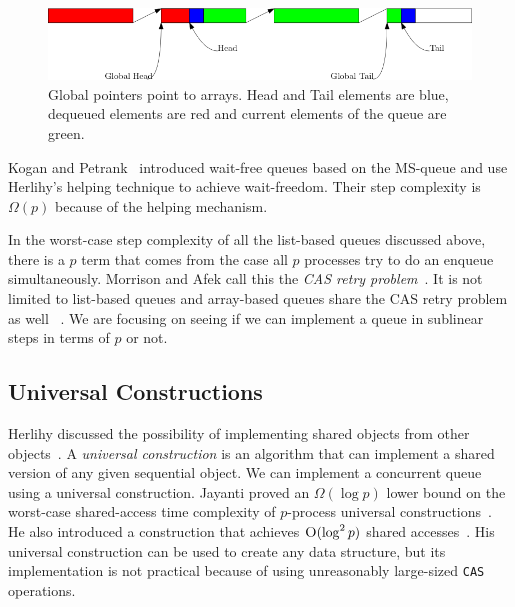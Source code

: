 \documentclass[10pt]{article}
\theoremstyle{definition}
\begin{document}
\begin{figure}[hbt]
  \center\includegraphics[scale=0.5]{pics/sundell}
    \caption{\label{fig::sundell}Global pointers point to arrays. Head and Tail elements are blue, dequeued elements are red and current elements of the queue are green.}
\end{figure}

Kogan and Petrank~\cite{DBLP:conf/ppopp/KoganP11} introduced wait-free queues based on the MS-queue and use Herlihy's helping technique to achieve wait-freedom. Their step complexity is $\Omega(p)$ because of the helping mechanism.


In the worst-case step complexity of all the list-based queues discussed above, there is a $p$ term that comes from the case all $p$ processes try to do an enqueue simultaneously. Morrison and Afek call this the \textit{CAS retry problem}~\cite{DBLP:conf/ppopp/MorrisonA13}. It is not limited to list-based queues and array-based queues share the CAS retry problem as well~\cite{DBLP:conf/spaa/TsigasZ01,DBLP:conf/icdcn/Shafiei09,DBLP:conf/iceccs/ColvinG05} . We are focusing on seeing if we can implement a queue in sublinear steps in terms of $p$ or not.

\subsection{Universal Constructions}
Herlihy discussed the possibility of implementing shared objects from other objects~\cite{10.1145/114005.102808}. A \textit{universal construction} is an algorithm that can implement a shared version of any given sequential object. We can implement a concurrent queue using a universal construction. Jayanti proved an $\Omega(\log p)$ lower bound on the worst-case shared-access time complexity of $p$-process universal constructions~\cite{DBLP:conf/podc/Jayanti98a}. He also introduced a construction that achieves $\textsc{O}(\log^2 p)$ shared accesses~\cite{DBLP:conf/podc/ChandraJT98}. His universal construction can be used to create any data structure, but its implementation is not practical because of using unreasonably large-sized \texttt{CAS} operations.
\end{document}
